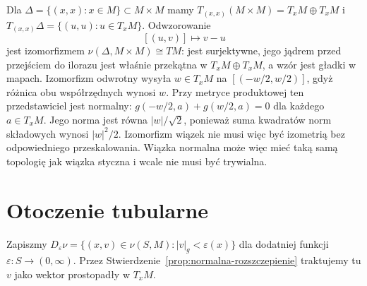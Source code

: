 \begin{przyklad}
\label{prz:normalna-diagonalna}
Dla $\Delta=\{(x,x):x\in M\}\subset M\times M$
mamy $T_{(x,x)}(M\times M)=T_xM\oplus T_xM$
i $T_{(x,x)}\Delta=\{(u,u):u\in T_xM\}$.
Odwzorowanie
\[
 [(u,v)]\longmapsto v-u
\]
jest izomorfizmem $\nu(\Delta,M\times M)\cong TM$:
jest surjektywne, jego jądrem przed
przejściem do ilorazu jest właśnie
przekątna w $T_xM\oplus T_xM$,
a wzór jest gładki w mapach.
Izomorfizm odwrotny wysyła $w\in T_xM$ na
$[(-w/2,w/2)]$, gdyż różnica obu współrzędnych wynosi $w$.
Przy metryce produktowej ten przedstawiciel jest normalny:
$g(-w/2,a)+g(w/2,a)=0$ dla każdego $a\in T_xM$.
Jego norma jest równa $|w|/\sqrt2$, ponieważ suma kwadratów
norm składowych wynosi $|w|^2/2$.
Izomorfizm wiązek nie musi więc być izometrią
bez odpowiedniego przeskalowania.
Wiązka normalna może więc mieć
taką samą topologię jak wiązka styczna
i wcale nie musi być trywialna.
\end{przyklad}

\section{Otoczenie tubularne}
\label{sec:otoczenie-tubularne}

Zapiszmy
$D_\varepsilon\nu
=\{(x,v)\in\nu(S,M):|v|_g<\varepsilon(x)\}$
dla dodatniej funkcji $\varepsilon:S\to(0,\infty)$.
Przez Stwierdzenie~\ref{prop:normalna-rozszczepienie}
traktujemy tu $v$ jako wektor prostopadły
w $T_xM$.

